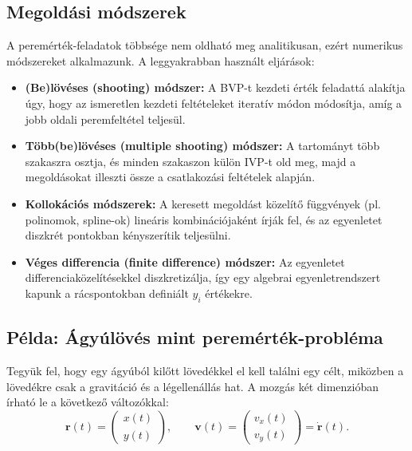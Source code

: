 \subsection{Megoldási módszerek}

A peremérték-feladatok többsége nem oldható meg analitikusan, ezért numerikus módszereket alkalmazunk. A leggyakrabban használt eljárások:

\begin{itemize}
  \item \textbf{(Be)lövéses (shooting) módszer:}  
  A BVP-t kezdeti érték feladattá alakítja úgy, hogy az ismeretlen kezdeti feltételeket iteratív módon módosítja, amíg a jobb oldali peremfeltétel teljesül.
  
  \item \textbf{Több(be)lövéses (multiple shooting) módszer:}  
  A tartományt több szakaszra osztja, és minden szakaszon külön IVP-t old meg, majd a megoldásokat illeszti össze a csatlakozási feltételek alapján.
  
  \item \textbf{Kollokációs módszerek:}  
  A keresett megoldást közelítő függvények (pl. polinomok, spline-ok) lineáris kombinációjaként írják fel, és az egyenletet diszkrét pontokban kényszerítik teljesülni.
  
  \item \textbf{Véges differencia (finite difference) módszer:}  
  Az egyenletet differenciaközelítésekkel diszkretizálja, így egy algebrai egyenletrendszert kapunk a rácspontokban definiált $y_i$ értékekre.
\end{itemize}


\subsection{Példa: Ágyúlövés mint peremérték-probléma}

Tegyük fel, hogy egy ágyúból kilőtt lövedékkel el kell találni egy célt, miközben a lövedékre csak a gravitáció és a légellenállás hat. A mozgás két dimenzióban írható le a következő változókkal:
\[
\mathbf{r}(t) = 
\begin{pmatrix}
x(t) \\[3pt]
y(t)
\end{pmatrix}, 
\qquad 
\mathbf{v}(t) = 
\begin{pmatrix}
v_x(t) \\[3pt]
v_y(t)
\end{pmatrix} = \dot{\mathbf{r}}(t).
\]

